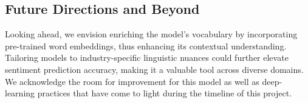 \subsection{Future Directions and Beyond}
\vspace{-1em}
Looking ahead, we envision enriching the model's vocabulary by incorporating pre-trained word embeddings, thus enhancing its contextual understanding. Tailoring models to industry-specific linguistic nuances could further elevate sentiment prediction accuracy, making it a valuable tool across diverse domains. We acknowledge the room for improvement for this model as well as deep-learning practices that have come to light during the timeline of this project.
